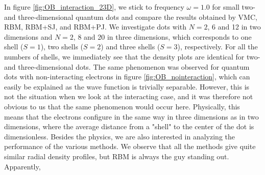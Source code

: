 In figure \eqref{fig:OB_interaction_23D}, we stick to frequency $\omega=1.0$ for small two- and three-dimensional quantum dots and compare the results obtained by VMC, RBM, RBM+SJ, and RBM+PJ. We investigate dots with $N=2$, 6 and 12 in two dimensions and $N=2$, 8 and 20 in three dimensions, which corresponds to one shell ($S=1$), two shells ($S=2$) and three shells ($S=3$), respectively. For all the numbers of shells, we immediately see that the density plots are identical for two- and three-dimensional dots. The same phenomenon was observed for quantum dots with non-interacting electrons in figure \eqref{fig:OB_nointeraction}, which can easily be explained as the wave function is trivially separable. However, this is not the situation when we look at the interacting case, and it was therefore not obvious to us that the same phenomenon would occur here. Physically, this means that the electrons configure in the same way in three dimensions as in two dimensions, where the average distance from a "shell" to the center of the dot is dimensionless. Besides the physics, we are also interested in analyzing the performance of the various methods. We observe that all the methods give quite similar radial density profiles, but RBM is always the guy standing out. Apparently,
